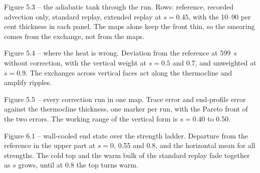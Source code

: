 \begin{qabox}{Figure 5.3 -- the adiabatic tank through the run.}
\explain Rows: reference, recorded advection only, standard replay, extended replay at $s=0.45$,
with the 10--90 per cent thickness in each panel. The maps alone keep the front thin, so the
smearing comes from the exchange, not from the maps.
\end{qabox}

\begin{qabox}{Figure 5.4 -- where the heat is wrong.}
\explain Deviation from the reference at 599~s without correction, with the vertical weight at
$s=0.5$ and 0.7, and unweighted at $s=0.9$. The exchanges across vertical faces act along the
thermocline and amplify ripples.
\end{qabox}

\begin{qabox}{Figure 5.5 -- every correction run in one map.}
\explain Trace error and end-profile error against the thermocline thickness, one marker per run,
with the Pareto front of the two errors. The working range of the vertical form is $s=0.40$ to 0.50.
\end{qabox}

\begin{qabox}{Figure 6.1 -- wall-cooled end state over the strength ladder.}
\explain Departure from the reference in the upper part at $s=0$, 0.55 and 0.8, and the horizontal
mean for all strengths. The cold top and the warm bulk of the standard replay fade together as $s$
grows, until at 0.8 the top turns warm.
\end{qabox}


